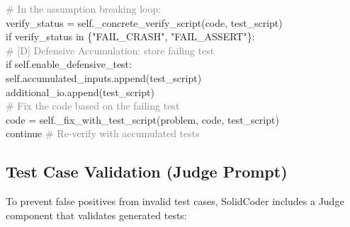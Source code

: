 \documentclass[11pt]{article}
\begin{document}
\begin{codebox}[title={\textcolor{white}{[D] Defensive Accumulation Logic}}, colframe=DefensiveColor!80!black, colback=DefensiveColor!5!white, boxed title style={colback=DefensiveColor!80!black}]
\small\ttfamily
\textcolor{gray}{\# In the assumption breaking loop:}\\
verify\_status = self.\_concrete\_verify\_script(code, test\_script)\\[0.3em]
if verify\_status in \{"FAIL\_CRASH", "FAIL\_ASSERT"\}:\\
\hspace*{1em}\textcolor{gray}{\# [D] Defensive Accumulation: store failing test}\\
\hspace*{1em}if self.enable\_defensive\_test:\\
\hspace*{2em}self.accumulated\_inputs.append(test\_script)\\
\hspace*{2em}additional\_io.append(test\_script)\\[0.3em]
\hspace*{1em}\textcolor{gray}{\# Fix the code based on the failing test}\\
\hspace*{1em}code = self.\_fix\_with\_test\_script(problem, code, test\_script)\\
\hspace*{1em}continue \textcolor{gray}{\# Re-verify with accumulated tests}
\end{codebox}

\subsection{Test Case Validation (Judge Prompt)}

To prevent false positives from invalid test cases, SolidCoder includes a Judge component that validates generated tests:
\end{document}
